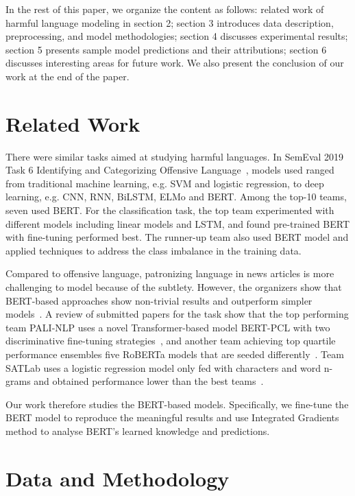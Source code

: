 \documentclass[11pt]{article}
\begin{document}
In the rest of this paper, we organize the content as follows: related work of harmful language modeling in section 2; section 3 introduces data description, preprocessing, and model methodologies; section 4 discusses experimental results; section 5 presents sample model predictions and their attributions; section 6 discusses interesting areas for future work. We also present the conclusion of our work at the end of the paper.


\section{Related Work}

There were similar tasks aimed at studying harmful languages. In SemEval 2019 Task 6 Identifying and Categorizing Offensive Language~\cite{zampieri2019semeval}, models used ranged from traditional machine learning, e.g. SVM and logistic regression, to deep learning, e.g. CNN, RNN, BiLSTM, ELMo and BERT. Among the top-10 teams, seven used BERT. For the classification task, the top team experimented with different models including linear models and LSTM, and found pre-trained BERT with fine-tuning performed best. The runner-up team also used BERT model and applied techniques to address the class imbalance in the training data.

Compared to offensive language, patronizing language in news articles is more challenging to model because of the subtlety. However, the organizers show that BERT-based approaches show non-trivial results and outperform simpler models~\cite{perez2020don}. A review of submitted papers for the task show that the top performing team PALI-NLP uses a novel Transformer-based model BERT-PCL with two discriminative fine-tuning strategies~\cite{hu2022pali}, and another team achieving top quartile performance ensembles five RoBERTa models that are seeded differently~\cite{zhao2022utsa}. Team SATLab uses a logistic regression model only fed with characters and word n-grams and obtained performance lower than the best teams~\cite{bestgen2022satlab}.

Our work therefore studies the BERT-based models. Specifically, we fine-tune the BERT model to reproduce the meaningful results and use Integrated Gradients~\cite{sundararajan2017axiomatic} method to analyse BERT's learned knowledge and predictions.

\section{Data and Methodology}
\end{document}
